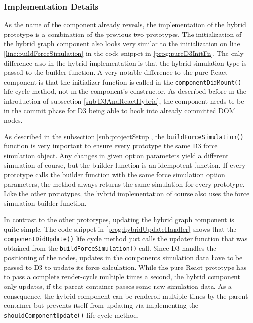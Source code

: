 \subsubsection{Implementation Details}

As the name of the component already reveals, the implementation of the hybrid prototype is a combination of the previous two prototypes. The initialization of the hybrid graph component also looks very similar to the initialization on line \ref{line:buildForceSimulation} in the code snippet in \ref{prog:pureD3InitFn}. The only difference also in the hybrid implementation is that the hybrid simulation type is passed to the builder function. A very notable difference to the pure React component is that the initializer function is called in the \texttt{componentDidMount()} life cycle method, not in the component's constructor. As described before in the introduction of subsection \ref{sub:D3AndReactHybrid}, the component needs to be in the commit phase for D3 being able to hook into already committed DOM nodes.

As described in the subsection \ref{sub:projectSetup}, the \texttt{buildForceSimulation()} function is very important to ensure every prototype the same D3 force simulation object. Any changes in given option parameters yield a different simulation of course, but the builder function is an idempotent function. If every prototype calls the builder function with the same force simulation option parameters, the method always returns the same simulation for every prototype. Like the other prototypes, the hybrid implementation of course also uses the force simulation builder function.

In contrast to the other prototypes, updating the hybrid graph component is quite simple. The code snippet in \ref{prog:hybridUpdateHandler} shows that the \texttt{componentDidUpdate()} life cycle method just calls the updater function that was obtained from the \texttt{buildForceSimulation()} call. Since D3 handles the positioning of the nodes, updates in the components simulation data have to be passed to D3 to update its force calculation. While the pure React prototype has to pass a complete render-cycle multiple times a second, the hybrid component only updates, if the parent container passes some new simulation data. As a consequence, the hybrid component can be rendered multiple times by the parent container but prevents itself from updating via implementing the \texttt{shouldComponentUpdate()} life cycle method.

